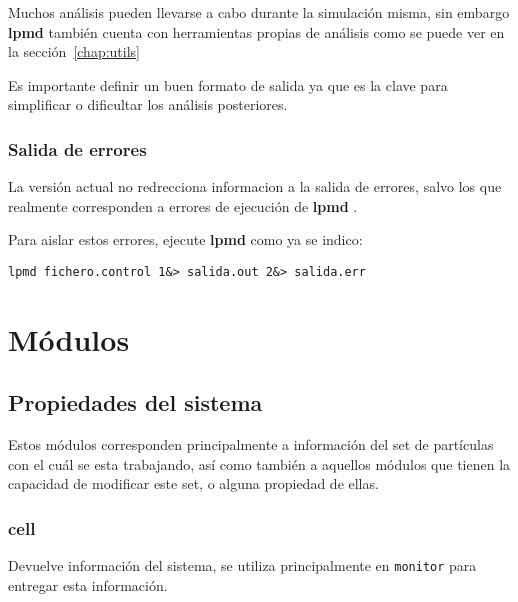 \documentclass[a4paper,10pt]{scrbook}
\newcommand{\lpmd}{\textbf{lpmd }}
\newcommand{\control}[1]{\begin{center}\begin{minipage}{10cm}\texttt{#1}\end{minipage}\end{center}}
\begin{document}
Muchos an\'alisis pueden llevarse a cabo durante la simulaci\'on misma, sin embargo \lpmd tambi\'en cuenta con herramientas propias de an\'alisis como se puede ver en la secci\'on~\ref{chap:utils}

Es importante definir un buen formato de salida ya que es la clave para simplificar o dificultar los an\'alisis posteriores.


\subsection{Salida de errores}
La versi\'on actual no redrecciona informacion a la salida de errores, salvo los que realmente corresponden a errores de ejecuci\'on de \lpmd.

Para aislar estos errores, ejecute \lpmd como ya se indico:

\control{lpmd fichero.control 1\&> salida.out 2\&> salida.err}


\chapter{M\'odulos}
\label{chap:modulos}

\section{Propiedades del sistema}
Estos m\'odulos corresponden principalmente a informaci\'on del set de part\'iculas con el cu\'al se esta trabajando, as\'i como tambi\'en a aquellos m\'odulos que tienen la capacidad de modificar este set, o alguna propiedad de ellas.
\subsection{cell}
Devuelve informaci\'on del sistema, se utiliza principalmente en \verb|monitor| para entregar esta informaci\'on.
\end{document}

